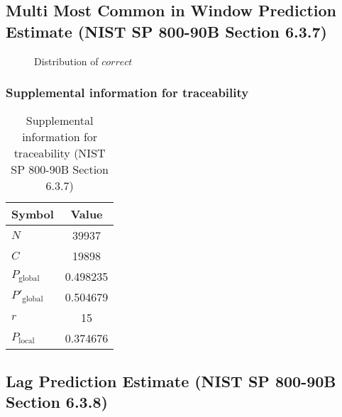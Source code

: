 \documentclass[a3paper,xelatex,english]{bxjsarticle}
\begin{document}
\subsection{Multi Most Common in Window Prediction Estimate (NIST SP 800-90B Section 6.3.7)}\label{sec:Binary637}

\begin{figure}[htbp]
\centering

\caption{Distribution of $correct$}
\end{figure}
\subsubsection{Supplemental information for traceability}
\renewcommand{\arraystretch}{1.8}
\begin{table}[h]
\caption{Supplemental information for traceability (NIST SP 800-90B Section 6.3.7)}
\begin{center}
\begin{tabular}{|l|c|}
\hline 
\rowcolor{anotherlightblue} %
Symbol				& Value \\ \hline 
$N$				& 39937\\ \hline 
$C$				& 19898\\ \hline 
$P_{\textrm{global}}$				& 0.498235\\ \hline 
$P'_{\textrm{global}}$			& 0.504679\\ \hline 
$r$				& 15\\ \hline 
$P_{\textrm{local}}$ 			& 0.374676\\ \hline
\end{tabular}
\end{center}
\end{table}
\renewcommand{\arraystretch}{1.4}
\clearpage
\subsection{Lag Prediction Estimate (NIST SP 800-90B Section 6.3.8)}\label{sec:Binary638}
\end{document}
